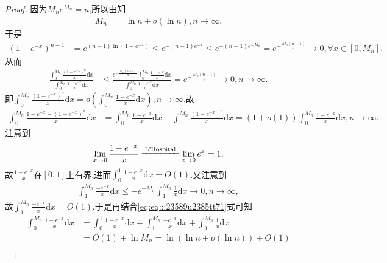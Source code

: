 \documentclass[../../main.tex]{subfiles}%
\begin{document}
\begin{proof}
因为$M_ne^{M_n}=n$,所以由知
\begin{align}
M_n&=\ln n+o\left( \ln n \right) ,n\rightarrow \infty .\label{eq:eq:::23589u2385tt71}
\end{align}
于是
\begin{align*}
\left( 1-e^{-x} \right) ^{n-1}&=e^{\left( n-1 \right) \ln \left( 1-e^{-x} \right)}\leqslant e^{-\left( n-1 \right) e^{-x}}\leqslant e^{-\left( n-1 \right) e^{-M_n}}=e^{-\frac{M_n\left( n-1 \right)}{n}}\rightarrow 0,\forall x\in \left[ 0,M_n \right] .
\end{align*}
从而
\begin{align*}
\frac{\int_0^{M_n}{\frac{\left( 1-e^{-x} \right) ^n}{x}\mathrm{d}x}}{\int_0^{M_n}{\frac{1-e^{-x}}{x}\mathrm{d}x}}&\leqslant \frac{e^{-\frac{M_n\left( n-1 \right)}{n}}\int_0^{M_n}{\frac{1-e^{-x}}{x}\mathrm{d}x}}{\int_0^{M_n}{\frac{1-e^{-x}}{x}\mathrm{d}x}}=e^{-\frac{M_n\left( n-1 \right)}{n}}\rightarrow 0,n\rightarrow \infty .
\end{align*}
即$\int_0^{M_n}{\frac{\left( 1-e^{-x} \right) ^n}{x}\mathrm{d}x}=o\left( \int_0^{M_n}{\frac{1-e^{-x}}{x}\mathrm{d}x} \right) ,n\rightarrow \infty .$故
\begin{align}
\int_0^{M_n}{\frac{1-e^{-x}-\left( 1-e^{-x} \right) ^n}{x}\mathrm{d}x}&=\int_0^{M_n}{\frac{1-e^{-x}}{x}\mathrm{d}x}-\int_0^{M_n}{\frac{\left( 1-e^{-x} \right) ^n}{x}\mathrm{d}x}=\left( 1+o\left( 1 \right) \right) \int_0^{M_n}{\frac{1-e^{-x}}{x}\mathrm{d}x},n\rightarrow \infty .\label{eq:108.1001}
\end{align}
注意到
\begin{align*}
\lim_{x\rightarrow 0}\frac{1-e^{-x}}{x}\xlongequal{\text{L'Hospital}}\lim_{x\rightarrow 0}e^x=1,
\end{align*}
故$\frac{1-e^{-x}}{x}$在$\left[ 0,1 \right]$上有界,进而$\int_0^1{\frac{1-e^{-x}}{x}\mathrm{d}x}=O(1)$.又注意到
\begin{align*}
\int_1^{M_n}{\frac{-e^{-x}}{x}\mathrm{d}x}\leqslant -e^{-M_n}\int_1^{M_n}{\frac{1}{x}\mathrm{d}x}\rightarrow 0,n\rightarrow \infty ,
\end{align*}
故$\int_1^{M_n}{\frac{-e^{-x}}{x}\mathrm{d}x}=O(1)$.于是再结合\eqref{eq:eq:::23589u2385tt71}式可知
\begin{align*}
\int_0^{M_n}{\frac{1-e^{-x}}{x}\mathrm{d}x}&=\int_0^1{\frac{1-e^{-x}}{x}\mathrm{d}x}+\int_1^{M_n}{\frac{-e^{-x}}{x}\mathrm{d}x}+\int_1^{M_n}{\frac{1}{x}\mathrm{d}x} \\
&=O\left( 1 \right) +\ln M_n=\ln \left( \ln n+o\left( \ln n \right) \right) +O\left( 1 \right) \\

\end{align*}
\end{proof}
\end{document}
